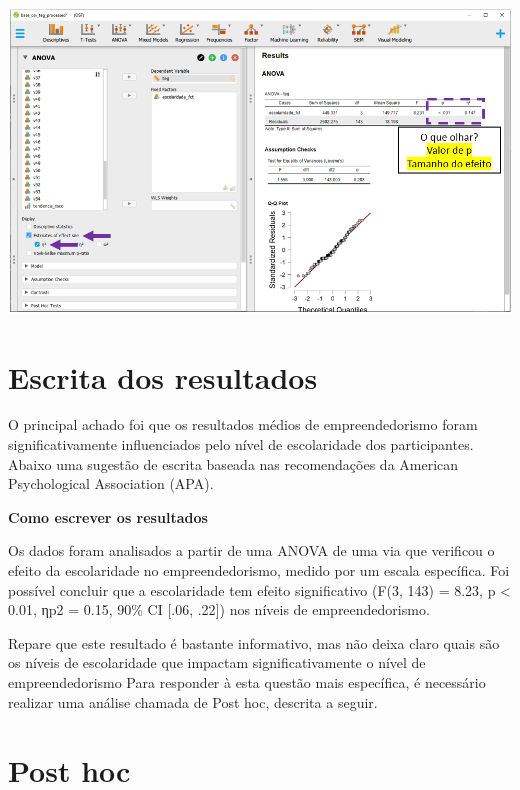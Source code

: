 \documentclass[
]{book}
\begin{document}
\includegraphics{./img/cap_anova_resultados.png}

\hypertarget{escrita-dos-resultados-3}{%
\section{Escrita dos resultados}\label{escrita-dos-resultados-3}}

O principal achado foi que os resultados médios de empreendedorismo foram significativamente influenciados pelo nível de escolaridade dos participantes. Abaixo uma sugestão de escrita baseada nas recomendações da American Psychological Association (APA).

\begin{writing}
\textbf{Como escrever os resultados}

Os dados foram analisados a partir de uma ANOVA de uma via que verificou
o efeito da escolaridade no empreendedorismo, medido por um escala
específica. Foi possível concluir que a escolaridade tem efeito
significativo (F(3, 143) = 8.23, p \textless{} 0.01, ηp2 = 0.15, 90\% CI
{[}.06, .22{]}) nos níveis de empreendedorismo.
\end{writing}

Repare que este resultado é bastante informativo, mas não deixa claro quais são os níveis de escolaridade que impactam significativamente o nível de empreendedorismo Para responder à esta questão mais específica, é necessário realizar uma análise chamada de Post hoc, descrita a seguir.

\hypertarget{post-hoc}{%
\section{Post hoc}\label{post-hoc}}
\end{document}
